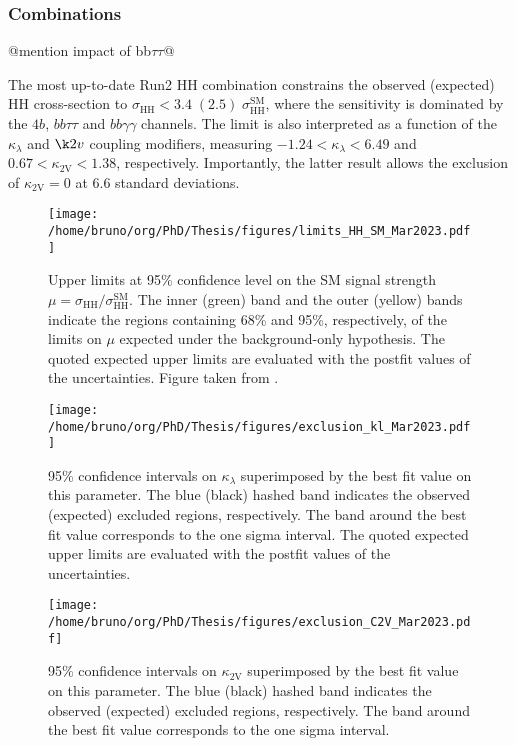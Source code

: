 \documentclass[11pt]{article}
\newcommand{\kl}{\kappa_{\lambda}}
\newcommand{\kvv}{\kappa_{\text{2V}}}
\newcommand{\xshhsm}{\sigma_{\text{HH}}^{\text{SM}}}
\newcommand{\xshh}{\sigma_{\text{HH}}}
\begin{document}
\subsubsection{Combinations}
\label{sec:orgc0aaf79}
\label{sec:Combinations}

@mention impact of bb\(\tau \tau\)@

The most up-to-date Run2 HH combination constrains the observed (expected) HH cross-section to \(\xshh < 3.4\;(2.5)\;\xshhsm\), where the sensitivity is dominated by the \(4b\), \(bb\tau\tau\) and \(bb\gamma\gamma\) channels. The limit is also interpreted as a function of the \(\kl\) and \(\k2v\) coupling modifiers, measuring \(-1.24 < \kl < 6.49\) and \(0.67 < \kvv < 1.38\), respectively. Importantly, the latter result allows the exclusion of \(\kvv=0\) at 6.6 standard deviations.

\begin{figure}[htbp]
\centering
\texttt{[image: /home/bruno/org/PhD/Thesis/figures/limits\_HH\_SM\_Mar2023.pdf]}
\caption{\label{fig:HH_nonres_comb_xsec}Upper limits at 95\% confidence level on the SM signal strength \(\mu = \xshh / \xshhsm\). The inner (green) band and the outer (yellow) bands indicate the regions containing 68\% and 95\%, respectively, of the limits on \(\mu\) expected under the background-only hypothesis. The quoted expected upper limits are evaluated with the postfit values of the uncertainties. Figure taken from \cite{summary_hig_twiki}.}
\end{figure}

\begin{figure}[htbp]
\centering
\texttt{[image: /home/bruno/org/PhD/Thesis/figures/exclusion\_kl\_Mar2023.pdf]}
\caption{\label{fig:HH_nonres_comb_kl}95\% confidence intervals on \(\kl\) superimposed by the best fit value on this parameter. The blue (black) hashed band indicates the observed (expected) excluded regions, respectively. The band around the best fit value corresponds to the one sigma interval. The quoted expected upper limits are evaluated with the postfit values of the uncertainties.}
\end{figure}

\begin{figure}[htbp]
\centering
\texttt{[image: /home/bruno/org/PhD/Thesis/figures/exclusion\_C2V\_Mar2023.pdf]}
\caption{\label{fig:HH_nonres_comb_c2v}95\% confidence intervals on \(\kvv\) superimposed by the best fit value on this parameter. The blue (black) hashed band indicates the observed (expected) excluded regions, respectively. The band around the best fit value corresponds to the one sigma interval.}
\end{figure}
\end{document}
